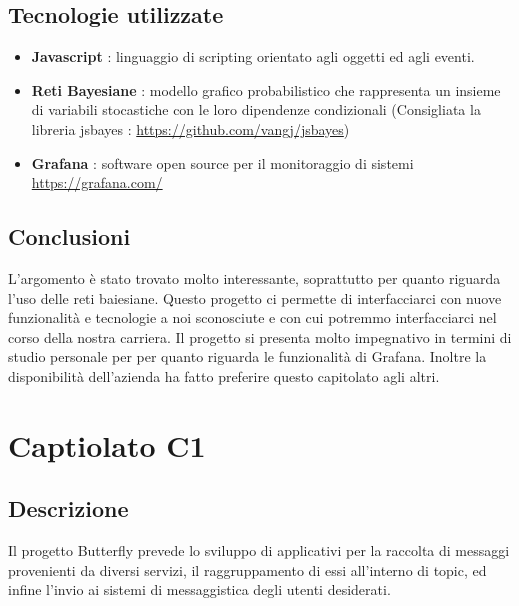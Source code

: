 \documentclass{article}
\begin{document}
        \subsection{Tecnologie utilizzate}
            \begin{itemize}
                \item \textbf{Javascript} : linguaggio di scripting orientato agli oggetti ed agli eventi.
                \item \textbf{Reti Bayesiane} : modello grafico probabilistico che rappresenta un insieme di variabili stocastiche con le loro dipendenze condizionali (Consigliata la libreria jsbayes : \url{https://github.com/vangj/jsbayes})
                \item \textbf{Grafana} : software open source per il monitoraggio di sistemi \url{https://grafana.com/}
            \end{itemize}
	\subsection{Conclusioni}
		L'argomento è stato trovato molto interessante, soprattutto per quanto riguarda l'uso delle reti baiesiane. Questo progetto ci permette di interfacciarci con nuove funzionalità e tecnologie a noi sconosciute e con cui potremmo interfacciarci nel corso della nostra carriera.
		Il progetto si presenta molto impegnativo in termini di studio personale per per quanto riguarda le funzionalità di Grafana.
		Inoltre la disponibilità dell'azienda ha fatto preferire questo capitolato agli altri.
\newpage

	\section{Captiolato C1}
		\subsection{Descrizione}
			Il progetto Butterfly prevede lo sviluppo di applicativi per la raccolta di messaggi provenienti da diversi servizi, il raggruppamento di essi all'interno di topic, ed infine l'invio ai sistemi di messaggistica degli utenti desiderati.
\end{document}
